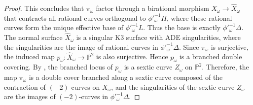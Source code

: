 \documentclass[12pt,reqno,a4paper]{amsart}
\theoremstyle{remark}
\theoremstyle{definition}
\newcommand{\PP}{\mathbb{P}}
\newcommand\Image{\mathrm{Im}}
\begin{document}
\begin{proof}
    This concludes that $\pi_\omega$ factor through a birational morphism $X_\omega \to \widehat{X}_\omega$ that contracts all rational curves orthogonal to $\phi'^{-1}_\omega H$, where these rational curves form the unique effective base of $\phi'^{-1}_\omega L$. Thus the base is exactly $\phi'^{-1}_\omega \Delta$.
    The normal surface $\widehat{X}_\omega$ is a singular K3 surface with ADE singularities, where the singularities are the image of rational curves in $\phi'^{-1}_\omega \Delta$.
    Since $\pi_\omega$ is surjective, the induced map $p_\omega\colon \widehat{X}_\omega \to \PP^2$ is also surjective.
    Hence $p_\omega$ is a branched double covering.
    By \cite[III, \S 7, Theorem 7.2]{barth2004compact}, the branched locus of $p_\omega$ is a sextic curve $Z_\omega$ on $\PP^2$.
    Therefore, the map $\pi_\omega$ is a double cover branched along a sextic curve composed of the contraction of $(-2)$-curves on $X_\omega$, and the singularities of the sextic curve $Z_\omega$ are the images of $(-2)$-curves in $\phi'^{-1}_\omega \Delta$.
\end{proof}
\end{document}
